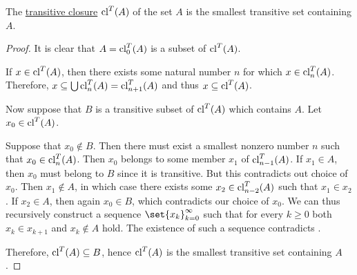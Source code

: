 \begin{proposition}\label{thm:transitive_closure_of_a_set}
  The \hyperref[def:transitive_closure_of_a_set]{transitive closure} \( \operatorname{cl}^T(A) \) of the set \( A \) is the smallest transitive set containing \( A \).
\end{proposition}
\begin{proof}
  It is clear that \( A = \operatorname{cl}_0^T(A) \) is a subset of \( \operatorname{cl}^T(A) \).

  If \( x \in \operatorname{cl}^T(A) \), then there exists some natural number \( n \) for which \( x \in \operatorname{cl}_n^T(A) \). Therefore, \( x \subseteq \bigcup \operatorname{cl}_n^T(A) = \operatorname{cl}_{n+1}^T(A) \) and thus \( x \subseteq \operatorname{cl}^T(A) \).

  Now suppose that \( B \) is a transitive subset of \( \operatorname{cl}^T(A) \) which contains \( A \). Let \( x_0 \in \operatorname{cl}^T(A) \).

  Suppose that \( x_0 \not\in B \). Then there must exist a smallest nonzero number \( n \) such that \( x_0 \in \operatorname{cl}_n^T(A) \). Then \( x_0 \) belongs to some member \( x_1 \) of \( \operatorname{cl}_{n-1}^T(A) \). If \( x_1 \in A \), then \( x_0 \) must belong to \( B \) since it is transitive. But this contradicts out choice of \( x_0 \). Then \( x_1 \not\in A \), in which case there exists some \( x_2 \in \operatorname{cl}_{n-2}^T(A) \) such that \( x_1 \in x_2 \). If \( x_2 \in A \), then again \( x_0 \in B \), which contradicts our choice of \( x_0 \). We can thus recursively construct a sequence \( \set{ x_k }_{k=0}^\infty \) such that for every \( k \geq 0 \) both \( x_k \in x_{k+1} \) and \( x_k \not\in A \) hold. The existence of such a sequence contradicts .

  Therefore, \( \operatorname{cl}^T(A) \subseteq B \), hence \( \operatorname{cl}^T(A) \) is the smallest transitive set containing \( A \).
\end{proof}

